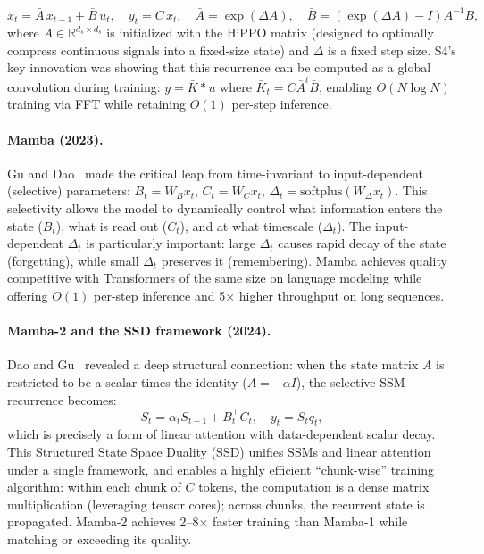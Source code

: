\begin{equation}
x_t = \bar{A}\, x_{t-1} + \bar{B}\, u_t, \quad y_t = C\, x_t, \quad \bar{A} = \exp(\Delta A), \quad \bar{B} = (\exp(\Delta A) - I) A^{-1} B,
\label{eq:s4}
\end{equation}
where $A \in \mathbb{R}^{d_s \times d_s}$ is initialized with the HiPPO matrix (designed to optimally compress continuous signals into a fixed-size state) and $\Delta$ is a fixed step size. S4's key innovation was showing that this recurrence can be computed as a global convolution during training: $y = \bar{K} * u$ where $\bar{K}_t = C \bar{A}^t \bar{B}$, enabling $O(N \log N)$ training via FFT while retaining $O(1)$ per-step inference.

\paragraph{Mamba (2023).}
Gu and Dao~\cite{gu2024mamba} made the critical leap from time-invariant to input-dependent (selective) parameters: $B_t = W_B x_t$, $C_t = W_C x_t$, $\Delta_t = \text{softplus}(W_\Delta x_t)$. This selectivity allows the model to dynamically control what information enters the state ($B_t$), what is read out ($C_t$), and at what timescale ($\Delta_t$). The input-dependent $\Delta_t$ is particularly important: large $\Delta_t$ causes rapid decay of the state (forgetting), while small $\Delta_t$ preserves it (remembering). Mamba achieves quality competitive with Transformers of the same size on language modeling while offering $O(1)$ per-step inference and 5$\times$ higher throughput on long sequences.

\paragraph{Mamba-2 and the SSD framework (2024).}
Dao and Gu~\cite{dao2024transformers} revealed a deep structural connection: when the state matrix $A$ is restricted to be a scalar times the identity ($A = -\alpha I$), the selective SSM recurrence becomes:
\begin{equation}
S_t = \alpha_t S_{t-1} + B_t^\top C_t, \quad y_t = S_t q_t,
\end{equation}
which is precisely a form of linear attention with data-dependent scalar decay. This Structured State Space Duality (SSD) unifies SSMs and linear attention under a single framework, and enables a highly efficient ``chunk-wise'' training algorithm: within each chunk of $C$ tokens, the computation is a dense matrix multiplication (leveraging tensor cores); across chunks, the recurrent state is propagated. Mamba-2 achieves 2--8$\times$ faster training than Mamba-1 while matching or exceeding its quality.

